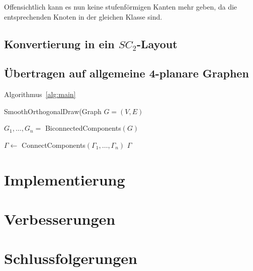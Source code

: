 \documentclass[a4paper]{scrreprt}
\theoremstyle{definition}
\begin{document}
Offensichtlich kann es nun keine stufenförmigen Kanten mehr geben, da die entsprechenden Knoten in der gleichen Klasse sind.

\section{Konvertierung in ein $SC_2$-Layout}



\section{Übertragen auf allgemeine 4-planare Graphen}

Algorithmus~\ref{alg:main}

\begin{algorithm}[ht]
  \caption{SmoothOrthogonalDraw(Graph $G = (V,E)$}
  \label{alg:main}
  
  $G_1, \dots, G_n =$ BiconnectedComponents$(G)$ \;
  
  $\Gamma \leftarrow$ ConnectComponents$(\Gamma_1, \dots, \Gamma_n)$ \;
  \Return $\Gamma$
\end{algorithm}


\chapter{Implementierung}

\chapter{Verbesserungen}

\chapter{Schlussfolgerungen}








\end{document}
